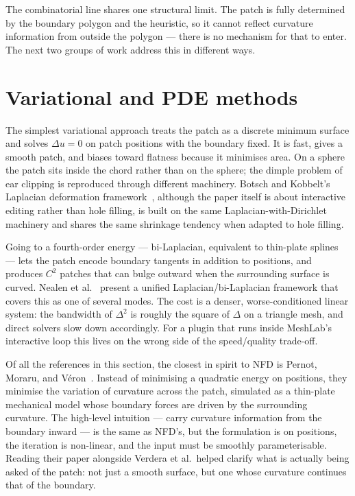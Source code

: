 The combinatorial line shares one structural limit. The patch is fully determined by the boundary polygon and the heuristic, so it cannot reflect curvature information from outside the polygon --- there is no mechanism for that to enter. The next two groups of work address this in different ways.

\section{Variational and PDE methods}

The simplest variational approach treats the patch as a discrete minimum surface and solves $\Delta u = 0$ on patch positions with the boundary fixed. It is fast, gives a smooth patch, and biases toward flatness because it minimises area. On a sphere the patch sits inside the chord rather than on the sphere; the dimple problem of ear clipping is reproduced through different machinery. Botsch and Kobbelt's Laplacian deformation framework~\cite{botsch2004}, although the paper itself is about interactive editing rather than hole filling, is built on the same Laplacian-with-Dirichlet machinery and shares the same shrinkage tendency when adapted to hole filling.

Going to a fourth-order energy --- bi-Laplacian, equivalent to thin-plate splines --- lets the patch encode boundary tangents in addition to positions, and produces $C^2$ patches that can bulge outward when the surrounding surface is curved. Nealen et al.~\cite{nealen2006} present a unified Laplacian/bi-Laplacian framework that covers this as one of several modes. The cost is a denser, worse-conditioned linear system: the bandwidth of $\Delta^2$ is roughly the square of $\Delta$ on a triangle mesh, and direct solvers slow down accordingly. For a plugin that runs inside MeshLab's interactive loop this lives on the wrong side of the speed/quality trade-off.

Of all the references in this section, the closest in spirit to NFD is Pernot, Moraru, and V{\'e}ron~\cite{pernot2006}. Instead of minimising a quadratic energy on positions, they minimise the variation of curvature across the patch, simulated as a thin-plate mechanical model whose boundary forces are driven by the surrounding curvature. The high-level intuition --- carry curvature information from the boundary inward --- is the same as NFD's, but the formulation is on positions, the iteration is non-linear, and the input must be smoothly parameterisable. Reading their paper alongside Verdera et al.\ helped clarify what is actually being asked of the patch: not just a smooth surface, but one whose curvature continues that of the boundary.

